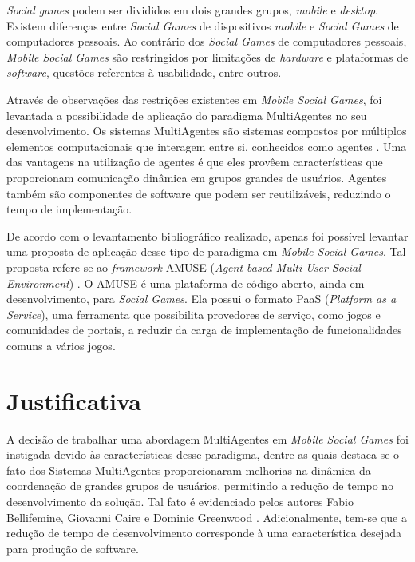 \textit{Social games} podem ser divididos em dois grandes grupos, \textit{mobile} e \textit{desktop}. Existem diferen\c{c}as entre \textit{Social Games} de dispositivos \textit{mobile} e \textit{Social Games} de computadores pessoais.
Ao contrário dos \textit{Social Games} de computadores pessoais, \textit{Mobile Social Games} são restringidos por limita\c{c}\~oes de \textit{hardware} e plataformas de \textit{software}, questões
referentes à usabilidade, entre outros\cite{yamakani2011}.

Através de observações das restrições existentes em \textit{Mobile Social Games}, foi levantada a possibilidade de aplicação do paradigma MultiAgentes
no seu desenvolvimento. Os sistemas MultiAgentes são sistemas
compostos por múltiplos elementos computacionais que interagem entre si, conhecidos como agentes \cite{wooldridge2009}.
Uma das vantagens na utilização de agentes é que eles provêem características que proporcionam comunicação dinâmica em
grupos grandes de usuários\cite{bergenti2015}. Agentes também são componentes de software que podem ser reutilizáveis, reduzindo o tempo de
implementação\cite{bergentiHuhns2014}.

De acordo com o levantamento bibliográfico realizado, apenas foi possível levantar uma proposta de aplicação desse
tipo de paradigma em \textit{Mobile Social Games}. Tal proposta refere-se ao \textit{framework} AMUSE (\textit{Agent-based Multi-User Social Environment})
\cite{amuse}. O AMUSE é uma plataforma de código aberto, ainda em desenvolvimento, para \textit{Social Games}.
Ela possui o formato PaaS (\textit{Platform as a Service})\cite{bergenti2015}, uma ferramenta que possibilita provedores de serviço,
como jogos e comunidades de portais, a reduzir da carga de implementação de funcionalidades
comuns a vários jogos\cite{bergenti2015}.

\section{Justificativa}

A decisão de trabalhar uma abordagem MultiAgentes em \textit{Mobile Social Games} foi instigada devido às características desse paradigma,
dentre as quais destaca-se o fato dos Sistemas MultiAgentes proporcionaram melhorias na dinâmica da coordenação de grandes grupos
de usuários, permitindo a redução de tempo no desenvolvimento da solução. Tal fato é evidenciado pelos autores Fabio Bellifemine, Giovanni Caire e Dominic Greenwood
\cite{fabio2007}. Adicionalmente, tem-se que a redução de tempo de desenvolvimento corresponde à uma característica desejada
para produção de software\cite{bergenti2015}.


